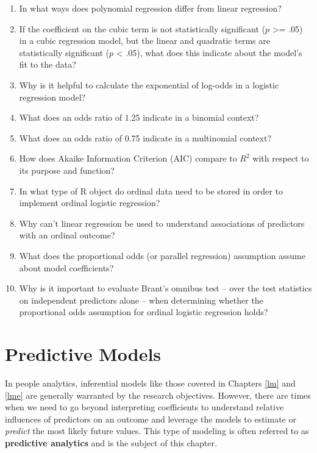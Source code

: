 \documentclass[
]{book}
\begin{document}
\begin{enumerate}
\def\labelenumi{\arabic{enumi}.}
\item
  In what ways does polynomial regression differ from linear regression?
\item
  If the coefficient on the cubic term is not statistically significant (\(p\) \textgreater= .05) in a cubic regression model, but the linear and quadratic terms are statistically significant (\(p\) \textless{} .05), what does this indicate about the model's fit to the data?
\item
  Why is it helpful to calculate the exponential of log-odds in a logistic regression model?
\item
  What does an odds ratio of 1.25 indicate in a binomial context?
\item
  What does an odds ratio of 0.75 indicate in a multinomial context?
\item
  How does Akaike Information Criterion (AIC) compare to \(R^2\) with respect to its purpose and function?
\item
  In what type of R object do ordinal data need to be stored in order to implement ordinal logistic regression?
\item
  Why can't linear regression be used to understand associations of predictors with an ordinal outcome?
\item
  What does the proportional odds (or parallel regression) assumption assume about model coefficients?
\item
  Why is it important to evaluate Brant's omnibus test -- over the test statistics on independent predictors alone -- when determining whether the proportional odds assumption for ordinal logistic regression holds?
\end{enumerate}

\hypertarget{pred-mod}{%
\chapter{Predictive Models}\label{pred-mod}}

In people analytics, inferential models like those covered in Chapters \ref{lm} and \ref{lme} are generally warranted by the research objectives. However, there are times when we need to go beyond interpreting coefficients to understand relative influences of predictors on an outcome and leverage the models to estimate or \emph{predict} the most likely future values. This type of modeling is often referred to as \textbf{predictive analytics} and is the subject of this chapter.
\end{document}
